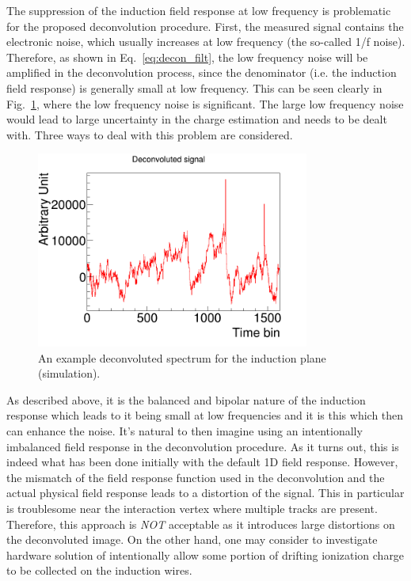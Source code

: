 The suppression of the induction field response at low frequency is problematic for the
proposed deconvolution procedure. First,  the measured signal contains the electronic noise, 
which usually increases at low frequency (the so-called 1/f noise). Therefore, as shown in 
Eq.~\eqref{eq:decon_filt}, the low frequency noise will be amplified in the deconvolution 
process, since the denominator (i.e. the induction field response) is generally small at 
low frequency. This can be seen clearly in Fig.~\ref{fig:decon_example}, where the low frequency noise
is significant. The large low frequency noise would lead to large uncertainty 
in the charge estimation and needs to be dealt with. Three ways to deal with this problem 
are considered. 

\begin{figure}[htb]
\centering
\includegraphics[width=0.8\textwidth]{figures/decon_example.png}
\caption{An example deconvoluted spectrum for the induction plane (simulation).}
\label{fig:decon_example}
\end{figure}


As described above, it is the balanced and bipolar nature of the
induction response which leads to it being small at low frequencies
and it is this which then can enhance the noise.
It's natural to then imagine using an intentionally imbalanced field
response in the deconvolution procedure.
As it turns out, this is indeed what has been done initially with the default 1D field response. 
However, the mismatch of the field response function
used in the deconvolution and the actual physical field response 
leads to a distortion of the signal. This in particular is troublesome
near the interaction vertex where multiple tracks are present. 
Therefore, this approach is {\it NOT} acceptable as it introduces large distortions
on the deconvoluted image. On the other hand, one may consider to investigate 
hardware solution of intentionally allow some portion of drifting ionization charge 
to be collected on the induction wires. 


